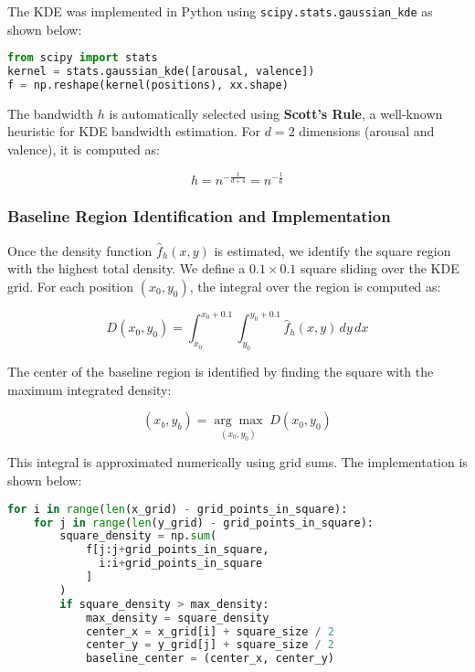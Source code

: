 \par The KDE was implemented in Python using \texttt{scipy.stats.gaussian\_kde} as shown below:

\begin{lstlisting}[language=Python, caption=Gaussian KDE implementation, basicstyle=\ttfamily\small]
from scipy import stats
kernel = stats.gaussian_kde([arousal, valence])
f = np.reshape(kernel(positions), xx.shape)
\end{lstlisting}

\par The bandwidth $h$ is automatically selected using \textbf{Scott's Rule}, a well-known heuristic for KDE bandwidth estimation. For $d = 2$ dimensions (arousal and valence), it is computed as:

\begin{equation}
h = n^{-\frac{1}{d+4}} = n^{-\frac{1}{6}}
\end{equation}

\subsubsection*{Baseline Region Identification and Implementation}

\par Once the density function $\hat{f}_h(x, y)$ is estimated, we identify the square region with the highest total density. We define a $0.1 \times 0.1$ square sliding over the KDE grid. For each position $(x_0, y_0)$, the integral over the region is computed as:

\begin{equation}
D(x_0, y_0) = \int_{x_0}^{x_0+0.1} \int_{y_0}^{y_0+0.1} \hat{f}_h(x, y) \, dy \, dx
\end{equation}

\par The center of the baseline region is identified by finding the square with the maximum integrated density:

\begin{equation}
(x_b, y_b) = \underset{(x_0, y_0)}{\arg\max} \; D(x_0, y_0)
\end{equation}

\par This integral is approximated numerically using grid sums. The implementation is shown below:

\begin{lstlisting}[language=Python, caption=Baseline region identification with KDE, basicstyle=\ttfamily\small]
for i in range(len(x_grid) - grid_points_in_square):
    for j in range(len(y_grid) - grid_points_in_square):
        square_density = np.sum(
            f[j:j+grid_points_in_square, 
              i:i+grid_points_in_square
            ]
        )
        if square_density > max_density:
            max_density = square_density
            center_x = x_grid[i] + square_size / 2
            center_y = y_grid[j] + square_size / 2
            baseline_center = (center_x, center_y)
\end{lstlisting}

